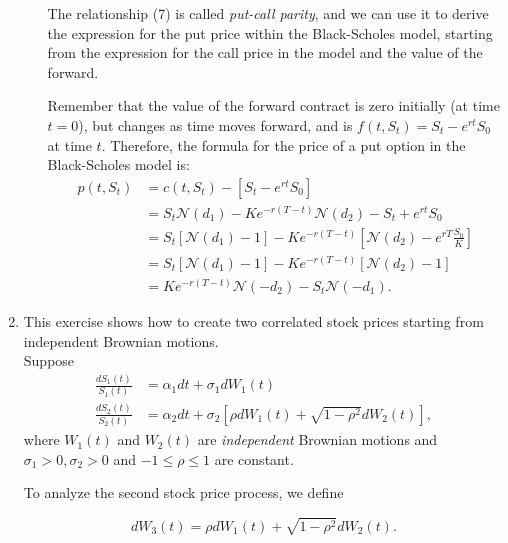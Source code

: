 \documentclass[handout,8pt]{beamer}
\begin{document}
\begin{frame}[allowframebreaks]{ }
\begin{enumerate}
\begin{enumerate}
        \newpage
        
The relationship (7) is called \textit{put-call parity}, and we can use it to derive the expression for the put price within the Black-Scholes model, starting from the expression for the call price in the model and the value of the forward. \newline

Remember that the value of the forward contract is zero initially (at time $t=0$), but changes as time moves forward, and is $f(t,S_t) = S_t - e^{rt}S_0$ at time $t$. Therefore, the formula for the price of a put option in the Black-Scholes model is:
        \begin{align*}
            p(t,S_t) &= c(t,S_t) - [S_t - e^{rt}S_0]\\
            &= S_t\mathcal{N}(d_1) -K e^{-r(T-t)}\mathcal{N}(d_2) - S_t + e^{rt}S_0\\
            &= S_t[\mathcal{N}(d_1)-1]-Ke^{-r(T-t)} \left[\mathcal{N}(d_2) - e^{rT}\frac{S_0}{K}\right]\\
            &= S_t[\mathcal{N}(d_1)-1]-Ke^{-r(T-t)} [\mathcal{N}(d_2) -1]\\
            &= Ke^{-r(T-t)}\mathcal{N}(-d_2) - S_t\mathcal{N}(-d_1).
        \end{align*}
        
    \end{enumerate}
    
    
    \item This exercise shows how to create two correlated stock prices starting from independent Brownian motions.\\
    Suppose
    \begin{align}
        \frac{dS_1(t)}{S_1(t)} &= \alpha_1 dt + \sigma_1 dW_1(t)\\
        \frac{dS_2(t)}{S_2(t)} &= \alpha_2 dt + \sigma_2 \left[ \rho dW_1(t) + \sqrt{1-\rho^2} dW_2(t)\right],
    \end{align}
    where $W_1(t)$ and $W_2(t)$ are \textit{independent} Brownian motions and $\sigma_1>0,\sigma_2>0$ and $-1\leq \rho \leq 1$ are constant. \newline
    
    \newline To analyze the second stock price process, we define
    
    \begin{equation*}
        dW_3(t) = \rho dW_1(t) + \sqrt{1-\rho^2} dW_2(t).
    \end{equation*}
    

\end{enumerate}
\end{frame}
\end{document}
